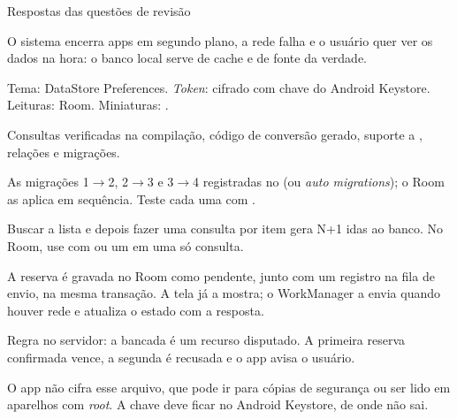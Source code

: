 \documentclass[aspectratio=169,10pt]{beamer}
\begin{document}
\begin{frame}{Respostas das questões de revisão}
  \begin{respostas}
    \item O sistema encerra apps em segundo plano, a rede falha e o usuário quer ver os dados na hora: o banco local serve de cache e de fonte da verdade.
    \item Tema: DataStore Preferences. \emph{Token}: cifrado com chave do Android Keystore. Leituras: Room. Miniaturas: .
    \item Consultas verificadas na compilação, código de conversão gerado, suporte a , relações e migrações.
    \item As migrações 1$\rightarrow$2, 2$\rightarrow$3 e 3$\rightarrow$4 registradas no  (ou \emph{auto migrations}); o Room as aplica em sequência. Teste cada uma com .
    \item Buscar a lista e depois fazer uma consulta por item gera N+1 idas ao banco. No Room, use  com  ou um  em uma só consulta.
    \item A reserva é gravada no Room como pendente, junto com um registro na fila de envio, na mesma transação. A tela já a mostra; o WorkManager a envia quando houver rede e atualiza o estado com a resposta.
    \item Regra no servidor: a bancada é um recurso disputado. A primeira reserva confirmada vence, a segunda é recusada e o app avisa o usuário.
    \item O app não cifra esse arquivo, que pode ir para cópias de segurança ou ser lido em aparelhos com \emph{root}. A chave deve ficar no Android Keystore, de onde não sai.
  \end{respostas}
\end{frame}

\end{document}
